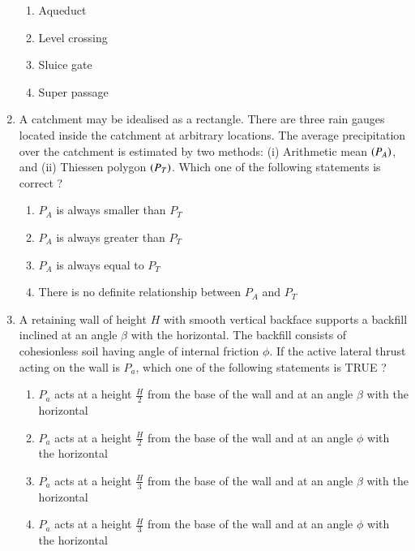 \documentclass[journal]{IEEEtran}
\begin{document}
\begin{enumerate}
\begin{enumerate}
    \item Aqueduct
    \item Level crossing
    \item Sluice gate
    \item Super passage \\
\end{enumerate}
\item A catchment may be idealised as a rectangle. There are three rain gauges located inside the catchment at arbitrary locations. The average precipitation over the catchment is estimated by two methods: (i) Arithmetic mean $\left(P_A\right)$, and (ii) Thiessen polygon $\left(P_T\right)$. Which one of the
following statements is correct ?
\begin{enumerate}
    \item $P_A$ is always smaller than $P_T$
    \item $P_A$ is always greater than $P_T$
    \item $P_A$ is always equal to $P_T$
    \item There is no definite relationship between $P_A$ and $P_T$ \\
\end{enumerate}
\item A retaining wall of height $H$ with smooth vertical backface supports a backfill inclined at an angle $\beta$ with the horizontal. The backfill consists of cohesionless soil having angle of internal friction $\phi$. If the active lateral thrust acting on the wall is $P_a$, which one of the following statements is TRUE ?
\begin{enumerate}
    \item $P_a$ acts at a height $\frac{H}{2}$ from the base of the wall and at an angle $\beta$ with the horizontal
    \item $P_a$ acts at a height $\frac{H}{2}$ from the base of the wall and at an angle $\phi$ with the horizontal
    \item $P_a$ acts at a height $\frac{H}{3}$ from the base of the wall and at an angle $\beta$ with the horizontal
    \item $P_a$ acts at a height $\frac{H}{3}$ from the base of the wall and at an angle $\phi$ with the horizontal \\
\end{enumerate}
			 \end{enumerate}
			 
\end{document}

